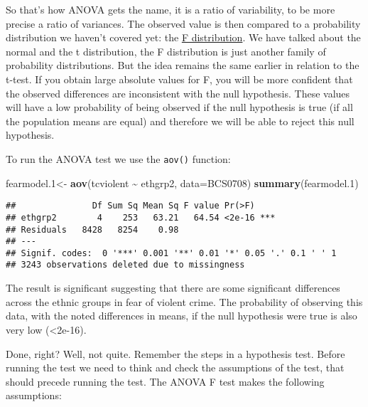 \documentclass[
]{book}
\newenvironment{Shaded}{\begin{snugshade}}{\end{snugshade}}
\newcommand{\AttributeTok}[1]{\textcolor[rgb]{0.13,0.29,0.53}{#1}}
\newcommand{\FloatTok}[1]{\textcolor[rgb]{0.00,0.00,0.81}{#1}}
\newcommand{\FunctionTok}[1]{\textcolor[rgb]{0.13,0.29,0.53}{\textbf{#1}}}
\newcommand{\NormalTok}[1]{#1}
\newcommand{\OtherTok}[1]{\textcolor[rgb]{0.56,0.35,0.01}{#1}}
\newcommand{\SpecialCharTok}[1]{\textcolor[rgb]{0.81,0.36,0.00}{\textbf{#1}}}
\begin{document}
So that's how ANOVA gets the name, it is a ratio of variability, to be more precise a ratio of variances. The observed value is then compared to a probability distribution we haven't covered yet: the \href{http://en.wikipedia.org/wiki/F-distribution}{F distribution}. We have talked about the normal and the t distribution, the F distribution is just another family of probability distributions. But the idea remains the same earlier in relation to the t-test. If you obtain large absolute values for F, you will be more confident that the observed differences are inconsistent with the null hypothesis. These values will have a low probability of being observed if the null hypothesis is true (if all the population means are equal) and therefore we will be able to reject this null hypothesis.

To run the ANOVA test we use the \texttt{aov()} function:

\begin{Shaded}
\begin{Highlighting}[]
\NormalTok{fearmodel}\FloatTok{.1}\OtherTok{\textless{}{-}} \FunctionTok{aov}\NormalTok{(tcviolent }\SpecialCharTok{\textasciitilde{}}\NormalTok{ ethgrp2, }\AttributeTok{data=}\NormalTok{BCS0708)}
\FunctionTok{summary}\NormalTok{(fearmodel}\FloatTok{.1}\NormalTok{)}
\end{Highlighting}
\end{Shaded}

\begin{verbatim}
##               Df Sum Sq Mean Sq F value Pr(>F)    
## ethgrp2        4    253   63.21   64.54 <2e-16 ***
## Residuals   8428   8254    0.98                   
## ---
## Signif. codes:  0 '***' 0.001 '**' 0.01 '*' 0.05 '.' 0.1 ' ' 1
## 3243 observations deleted due to missingness
\end{verbatim}

The result is significant suggesting that there are some significant differences across the ethnic groups in fear of violent crime. The probability of observing this data, with the noted differences in means, if the null hypothesis were true is also very low (\textless2e-16).

Done, right? Well, not quite. Remember the steps in a hypothesis test. Before running the test we need to think and check the assumptions of the test, that should precede running the test. The ANOVA F test makes the following assumptions:
\end{document}
